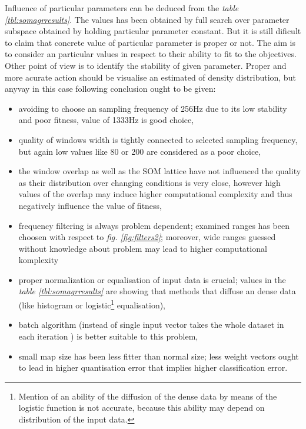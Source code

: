 \documentclass[a4paper]{IEEEtran}
\begin{document}
Influence of particular parameters can be deduced from the 
\textit{table \ref{tbl:somagrresults}}. The values has been obtained by full search over 
parameter subspace obtained by holding particular parameter constant.
But it is still dificult to claim that concrete value of particular parameter is proper 
or not. The aim is to consider an particular values in respect to their ability
to fit to the objectives. Other point of view is to identify the stability of given 
parameter. Proper and more acurate action should be visualise an estimated of density
distribution, but anyvay in this case following conclusion ought to be given:
\begin{itemize}
	\item avoiding to choose an sampling frequency of 256Hz due to its low stability and 
	poor fitness, value of 1333Hz is good choice,
	\item quality of windows width is tightly connected to selected sampling frequency,
	but again low values like 80 or 200 are considered as a poor choice,
	\item the window overlap as well as the SOM lattice have not influenced
	the quality as their distribution over changing conditions is very close, however high
	values of the overlap may induce higher computational complexity and thus negatively
	influence the value of fitness,
	\item frequency filtering is always problem dependent; examined ranges has been choosen
	with respect to \textit{fig. \ref{fig:filters2}}; moreover, wide ranges guessed
	without knowledge about problem may lead to higher computational komplexity
	\item proper normalization or equalisation of input data is crucial; values in the
	\textit{table \ref{tbl:somagrresults}} are showing that methods that diffuse an 
	dense data (like histogram or logistic\footnote{Mention of an ability of the diffusion of the dense data 	by means of the logistic function is not accurate, because this ability may depend on	distribution of the input data.} equalisation),
	\item batch algorithm (instead of single input vector takes the whole dataset in each
	iteration \cite{somtoolbox}) is better suitable to this problem,
	\item small map size has been less fitter than normal size; less weight vectors 
	ought to lead in higher quantisation error that implies higher classification error.	
\end{itemize}
\end{document}

